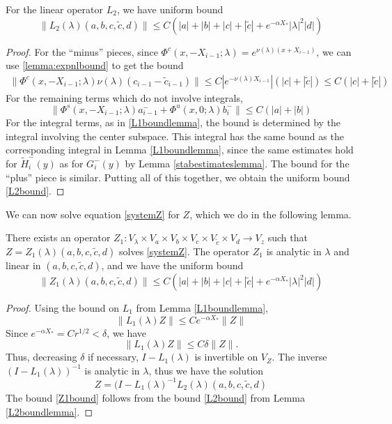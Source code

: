 \documentclass[thesis.tex]{subfiles}
\begin{document}
\begin{lemma}\label{L2boundlemma}
For the linear operator $L_2$, we have uniform bound
\begin{equation}\label{L2bound}
\| L_2(\lambda) (a,b,c,\tilde{c},d) \| \leq C\left(|a| + |b| + |c| + |\tilde{c}| + e^{-\alpha X_*}|\lambda|^2|d|\right)
\end{equation}
\begin{proof}
For the ``minus'' pieces, since $\Phi^c(x, -X_{i-1}; \lambda) = e^{\nu(\lambda)(x + X_{i-1})}$, we can use \cref{lemma:expnlbound} to get the bound
\begin{align*}
\| \Phi^c(x, -X_{i-1}; \lambda) \nu(\lambda)(c_{i-1} - \tilde{c}_{i-1}) \| \leq C |e^{-\nu(\lambda)X_{i-1}}|(|c| + |\tilde{c}|) \leq C (|c| + |\tilde{c}|)
\end{align*}
For the remaining terms which do not involve integrals,
\[
\| \Phi^s(x, -X_{i-1}; \lambda) a_{i-1}^- + \Phi^u(x, 0; \lambda) b_i^- \| \leq C(|a| + |b|)
\]
For the integral terms, as in \cref{L1boundlemma}, the bound is determined by the integral involving the center subspace. This integral has the same bound as the corresponding integral in Lemma \ref{L1boundlemma}, since the same estimates hold for $\tilde{H}_i^-(y)$ as for $G_i^-(y)$ by Lemma \ref{stabestimateslemma}. The bound for the ``plus'' piece is similar. Putting all of this together, we obtain the uniform bound \cref{L2bound}.
\end{proof}
\end{lemma}

We can now solve equation \eqref{systemZ} for $Z$, which we do in the following lemma.

\begin{lemma}\label{Zinv0}
There exists an operator $Z_1: V_\lambda \times V_a \times V_b \times V_c \times V_{\tilde{c}} \times V_d \rightarrow V_z$ such that $Z = Z_1(\lambda)(a,b,c,\tilde{c},d)$ solves \eqref{systemZ}. The operator $Z_1$ is analytic in $\lambda$ and linear in $(a,b,c,\tilde{c},d)$, and we have the uniform bound
\begin{equation}\label{Z1bound}
\| Z_1(\lambda)(a,b,c,\tilde{c},d) \| \leq C\left(|a| + |b| + |c| + |\tilde{c}| + e^{-\alpha X_*}|\lambda|^2|d|\right)
\end{equation}
\begin{proof}
Using the bound on $L_1$ from Lemma \ref{L1boundlemma}, 
\[
\|L_1(\lambda)Z\| \leq C e^{-\alpha X_*}\|Z\|
\]
Since $e^{-\alpha X_*} = C r^{1/2} < \delta$, we have
\[
\|L_1(\lambda)Z\| \leq C \delta \|Z\|.
\]
Thus, decreasing $\delta$ if necessary, $I - L_1(\lambda)$ is invertible on $V_Z$. The inverse $(I - L_1(\lambda))^{-1}$ is analytic in $\lambda$, thus we have the solution
\begin{equation}\label{L1L2eq}
Z = (I - L_1(\lambda)^{-1}L_2(\lambda)(a,b,c,\tilde{c},d)
\end{equation}
The bound \eqref{Z1bound} follows from the bound \eqref{L2bound} from Lemma \ref{L2boundlemma}.
\end{proof}
\end{lemma}
\end{document}
